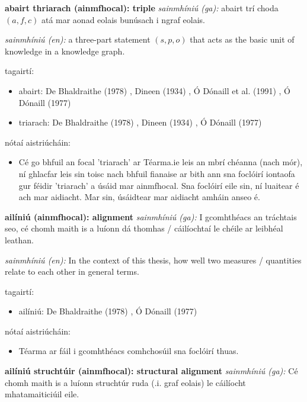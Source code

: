\documentclass{article}
\begin{document}
\textbf{abairt thriarach (ainmfhocal): triple}
\textit{sainmhíniú (ga):} abairt trí choda $(a,f,c)$ atá mar aonad eolais bunúsach i ngraf eolais.

\textit{sainmhíniú (en):} a three-part statement $(s,p,o)$ that acts as the basic unit of knowledge in a knowledge graph.

tagairtí:
\begin{itemize}
	\item abairt: De Bhaldraithe (1978) \cite{de-bhaldraithe}, Dineen (1934) \cite{dineen}, Ó Dónaill et al. (1991) \cite{focloir-beag}, Ó Dónaill (1977) \cite{odonaill}
	\item triarach: De Bhaldraithe (1978) \cite{de-bhaldraithe}, Dineen (1934) \cite{dineen}, Ó Dónaill (1977) \cite{odonaill}
\end{itemize}

nótaí aistriúcháin:
\begin{itemize}
	\item Cé go bhfuil an focal 'triarach' ar Téarma.ie leis an mbrí chéanna (nach mór), ní ghlacfar leis sin toisc nach bhfuil fianaise ar bith ann sna foclóirí iontaofa gur féidir 'triarach' a úsáid mar ainmfhocal. Sna foclóirí eile sin, ní luaitear é ach mar aidiacht. Mar sin, úsáidtear mar aidiacht amháin anseo é.
\end{itemize}


\textbf{ailíniú (ainmfhocal): alignment}
\textit{sainmhíniú (ga):} I gcomhthéacs an tráchtais seo, cé chomh maith is a luíonn dá thomhas / cáilíochtaí le chéile ar leibhéal leathan.

\textit{sainmhíniú (en):} In the context of this thesis, how well two measures / quantities relate to each other in general terms.

tagairtí:
\begin{itemize}
	\item ailíniú: De Bhaldraithe (1978) \cite{de-bhaldraithe}, Ó Dónaill (1977) \cite{odonaill}
\end{itemize}

nótaí aistriúcháin:
\begin{itemize}
	\item Téarma ar fáil i gcomhthéacs comhchosúil sna foclóirí thuas.
\end{itemize}


\textbf{ailíniú struchtúir (ainmfhocal): structural alignment}
\textit{sainmhíniú (ga):} Cé chomh maith is a luíonn struchtúr ruda (.i. graf eolais) le cáilíocht mhatamaiticiúil eile.
\end{document}
